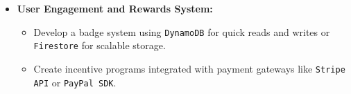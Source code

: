 \begin{itemize}
    \item \textbf{User Engagement and Rewards System:}
    \begin{itemize}
        \item Develop a badge system using \texttt{DynamoDB} for quick reads and writes or \texttt{Firestore} for scalable storage.
        \item Create incentive programs integrated with payment gateways like \texttt{Stripe API} or \texttt{PayPal SDK}.
    \end{itemize}
\end{itemize}

